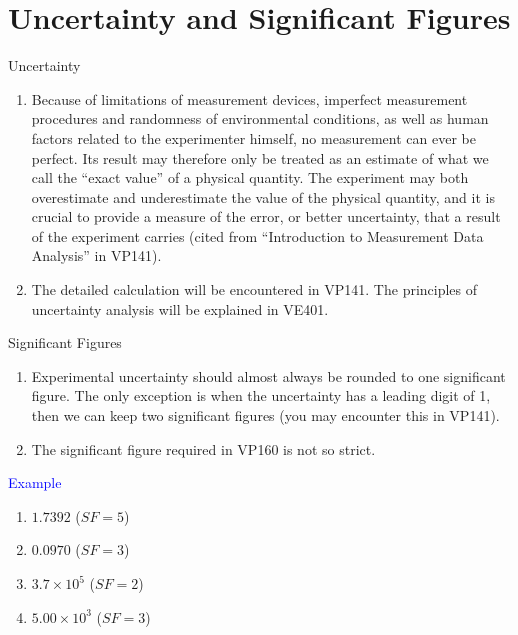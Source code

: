\documentclass{beamer}
\begin{document}
\section{Uncertainty and Significant Figures}
\begin{frame}{Uncertainty}
  \begin{enumerate}
    \item Because of limitations of measurement devices, imperfect
    measurement procedures and randomness of environmental
    conditions, as well as human factors related to the experimenter
    himself, no measurement can ever be perfect. Its result may therefore
    only be treated as an estimate of what we call the ``exact value” of a
    physical quantity. The experiment may both overestimate and
    underestimate the value of the physical quantity, and it is crucial to
    provide a measure of the error, or better uncertainty, that a result of
    the experiment carries (cited from ``Introduction to Measurement
    Data Analysis” in VP141).
    \pause
    \item The detailed calculation will be encountered in VP141. The principles of uncertainty analysis will be explained in VE401.
  \end{enumerate}
\end{frame}

\begin{frame}{Significant Figures} 
    \begin{enumerate}
      \item Experimental uncertainty should almost always be rounded to one significant figure. The only exception is when the uncertainty has a leading digit of 1, then we can keep two significant figures (you may encounter this in VP141).
      \pause
      \item The significant figure required in VP160 is not so strict.
    \end{enumerate}
    \pause 
    \textcolor{blue}{Example}
    \begin{enumerate}
      \item $1.7392$ ($SF = 5$)
      \item $0.0970$ ($SF = 3$)
      \item $3.7\times 10^5$ ($SF = 2$)
      \item $5.00\times 10^3$ ($SF = 3$)
    \end{enumerate}
\end{frame}
\end{document}
